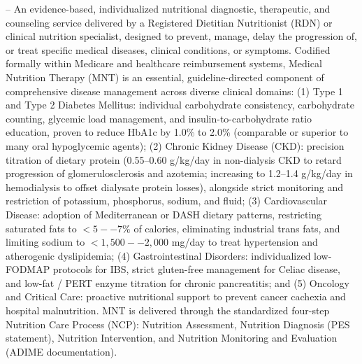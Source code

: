 -- An evidence-based, individualized nutritional diagnostic, therapeutic, and counseling service delivered by a Registered Dietitian Nutritionist (RDN) or clinical nutrition specialist, designed to prevent, manage, delay the progression of, or treat specific medical diseases, clinical conditions, or symptoms. Codified formally within Medicare and healthcare reimbursement systems, Medical Nutrition Therapy (MNT) is an essential, guideline-directed component of comprehensive disease management across diverse clinical domains: (1) Type 1 and Type 2 Diabetes Mellitus: individual carbohydrate consistency, carbohydrate counting, glycemic load management, and insulin-to-carbohydrate ratio education, proven to reduce HbA1c by 1.0\% to 2.0\% (comparable or superior to many oral hypoglycemic agents); (2) Chronic Kidney Disease (CKD): precision titration of dietary protein (0.55--0.60 g/kg/day in non-dialysis CKD to retard progression of glomerulosclerosis and azotemia; increasing to 1.2--1.4 g/kg/day in hemodialysis to offset dialysate protein losses), alongside strict monitoring and restriction of potassium, phosphorus, sodium, and fluid; (3) Cardiovascular Disease: adoption of Mediterranean or DASH dietary patterns, restricting saturated fats to $<5--7\%$ of calories, eliminating industrial trans fats, and limiting sodium to $<1,500--2,000$ mg/day to treat hypertension and atherogenic dyslipidemia; (4) Gastrointestinal Disorders: individualized low-FODMAP protocols for IBS, strict gluten-free management for Celiac disease, and low-fat / PERT enzyme titration for chronic pancreatitis; and (5) Oncology and Critical Care: proactive nutritional support to prevent cancer cachexia and hospital malnutrition. MNT is delivered through the standardized four-step Nutrition Care Process (NCP): Nutrition Assessment, Nutrition Diagnosis (PES statement), Nutrition Intervention, and Nutrition Monitoring and Evaluation (ADIME documentation).

